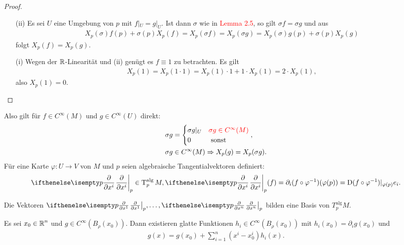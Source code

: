 \begin{proof}\begin{enumerate}[label=(\roman*),widest=ii,leftmargin=*]
\item[(ii)]
	Es sei $U$ eine Umgebung von $p$ mit $f|_U = g|_U$. Ist dann $\sigma$ wie in \textcolor{red}{Lemma 2.5}, so gilt $\sigma f = \sigma g$ und aus
	\begin{align*}
		X_p(\sigma)f(p)+\sigma(p)X_p(f) = X_{p}(\sigma f) = X_p(\sigma g) = X_p(\sigma) g(p) + \sigma(p) X_p(g)
	\end{align*}
	folgt $X_p(f) = X_p(g)$.\\
\item[(i)]
	Wegen der $\operatorname{\mathbb{R}}$-Linearität und (ii) genügt es $f \equiv 1$ zu betrachten. Es gilt
	\begin{align*}
		X_p(1) = X_p(1 \cdot 1) = X_p(1) \cdot 1 + 1 \cdot X_p(1) = 2 \cdot X_p(1),
	\end{align*}
	also $X_p(1) = 0$.
\end{enumerate}\end{proof}

\begin{Bem}
  Also gilt für $f \in C^{\infty}(M)$ und $g \in C^{\infty}(U)$ direkt:
  \begin{align*}
    & \sigma g =
    \begin{cases}
      \sigma g|_U & \textcolor{red}{\sigma g \in C^{\infty}(M)}\\
      0 & \text{ sonst }
    \end{cases},\\
    & \sigma g \in C^{\infty}(M) 
    \Rightarrow X_p(g) = X_p(\sigma g).
  \end{align*}
  Für eine Karte $\varphi \colon U \to V$ von $M$ und $p$ seien algebraische Tangentialvektoren definiert:
  \begin{align*}
    \pdifffrac[p]{}{x^i} \in \T_p^{\text{alg}}M, \pdifffrac[p]{}{x^i}(f) = \partial_i(f \circ \varphi^{-1})(\varphi(p)) = \D(f \circ \varphi^{-1})|_{\varphi(p)}e_i.
  \end{align*}
\end{Bem}

\begin{Satz}
  Die Vektoren $\pdifffrac[p]{}{x^1},\ldots,\pdifffrac[p]{}{x^n}$ bilden eine Basis von $T_p^{\text{alg}}M$.
\end{Satz}

\begin{Lemma}
  Es sei $x_0 \in \operatorname{\mathbb{R}}^n$ und $g \in C^{\infty}(B_{\rho}(x_0))$.
  Dann existieren glatte Funktionen $h_i \in C^{\infty}(B_{\rho}(x_0))$ mit $h_i(x_0) = \partial_ig(x_0)$ und 
  \begin{align*}
    g(x) = g(x_0) + \sum_{i=1}^n(x^i-x_0^i)h_i(x).
  \end{align*}
\end{Lemma}

